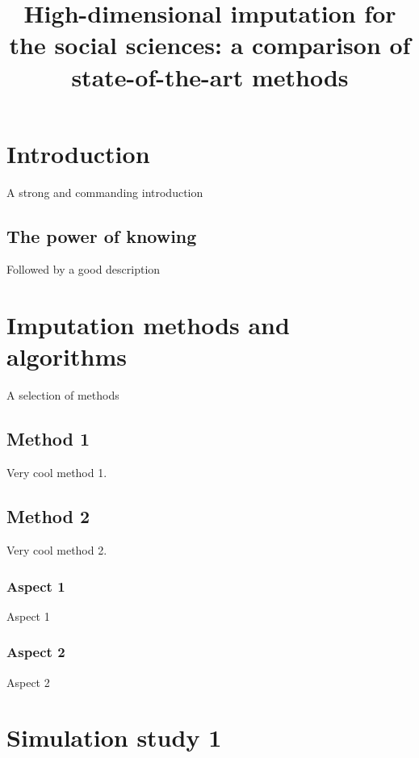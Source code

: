\documentclass[a4paper,doc,floatsintext,natbib]{apa6}\usepackage[]{graphicx}\usepackage[]{xcolor}
\title{High-dimensional imputation for the social sciences: a comparison of state-of-the-art methods}
\begin{document}
	\maketitle

    \setcounter{secnumdepth}{3} %

    
\section{Introduction}

    A strong and commanding introduction

\subsection{The power of knowing}

    Followed by a good description
    
\section{Imputation methods and algorithms}\label{sec:methods}

	A selection of methods

\subsection{Method 1}

	Very cool method 1.

\subsection{Method 2}

	Very cool method 2.

\subsubsection{Aspect 1}

	Aspect 1

\subsubsection{Aspect 2}

	Aspect 2
    
\section{Simulation study 1}
\end{document}
